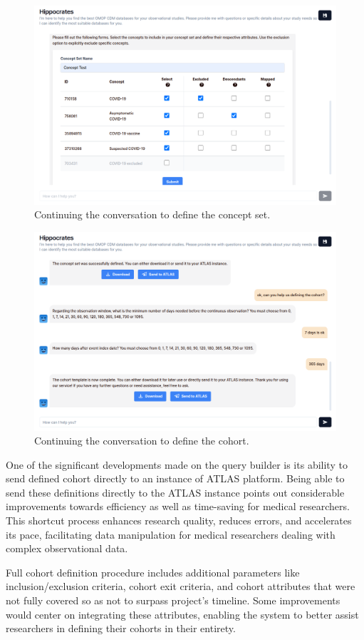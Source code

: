 \begin{figure}[H]
    \includegraphics[width=\textwidth]{figs/chapter5/chat2.png}
    \centering
    \caption[Continuing the conversation to define the concept set]{Continuing the conversation to define the concept set.}
    \label{fig_chat2}
\end{figure}

\begin{figure}[H]
    \includegraphics[width=\textwidth]{figs/chapter5/chat3.png}
    \centering
    \caption[Continuing the conversation to define the cohort]{Continuing the conversation to define the cohort.}
    \label{fig_chat3}
\end{figure}


One of the significant developments made on the query builder is its ability to send defined cohort directly to an instance of ATLAS platform. Being able to send these definitions directly to the ATLAS instance points out considerable improvements towards efficiency as well as time-saving for medical researchers. This shortcut process enhances research quality, reduces errors, and accelerates its pace, facilitating data manipulation for medical researchers dealing with complex observational data.

Full cohort definition procedure includes additional parameters like inclusion/exclusion criteria, cohort exit criteria, and cohort attributes that were not fully covered so as not to surpass project's timeline. Some improvements would center on integrating these attributes, enabling the system to better assist researchers in defining their cohorts in their entirety.
